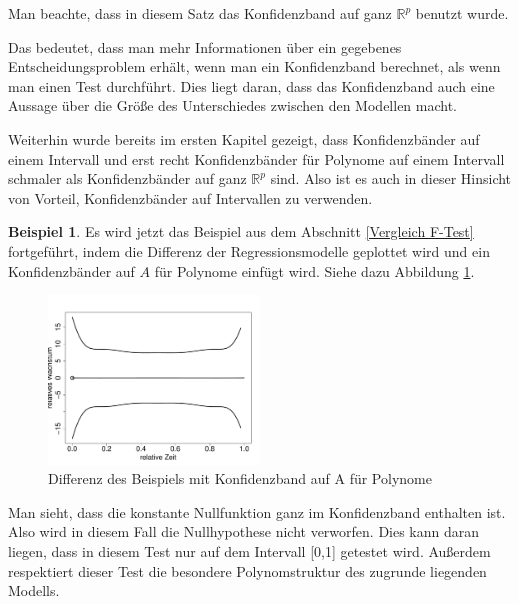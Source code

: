\documentclass[12pt,a4paper]{article}
\theoremstyle{definition}
\newtheorem{Beispiel}[Definition]{Beispiel}
\theoremstyle{definition}
\theoremstyle{definition}
\theoremstyle{definition}
\begin{document}
Man beachte, dass in diesem Satz das Konfidenzband auf ganz $\mathbb{R}^{p}$ benutzt wurde. 

Das bedeutet, dass man mehr Informationen über ein gegebenes Entscheidungsproblem erhält, wenn man ein Konfidenzband berechnet, als wenn man einen Test durchführt. Dies liegt daran, dass das Konfidenzband auch eine Aussage über die Größe des Unterschiedes zwischen den Modellen macht.

Weiterhin wurde bereits im ersten Kapitel gezeigt, dass Konfidenzbänder auf einem Intervall und erst recht Konfidenzbänder für Polynome auf einem Intervall schmaler als Konfidenzbänder auf ganz $\mathbb{R}^{p}$ sind. Also ist es auch in dieser Hinsicht von Vorteil, Konfidenzbänder auf Intervallen zu verwenden.


\begin{Beispiel}
Es wird jetzt das Beispiel aus dem Abschnitt \ref{Vergleich F-Test} fortgeführt, indem die Differenz der Regressionsmodelle geplottet wird und ein Konfidenzbänder auf $A$ für Polynome einfügt wird. Siehe dazu Abbildung \ref{KB-poly-hetero-BSP}.

\begin{figure}[H] 
  \centering
     \includegraphics[width=0.5\textwidth]{Bsp-KB-poly-hetero}
  \caption{Differenz des Beispiels mit Konfidenzband auf A für Polynome}
  \label{KB-poly-hetero-BSP}
\end{figure}

Man sieht, dass die konstante Nullfunktion ganz im Konfidenzband enthalten ist. Also wird in diesem Fall die Nullhypothese nicht verworfen. Dies kann daran liegen, dass in diesem Test nur auf dem Intervall [0,1] getestet wird. Außerdem respektiert dieser Test die besondere Polynomstruktur des zugrunde liegenden Modells.

\end{Beispiel}
\end{document}
